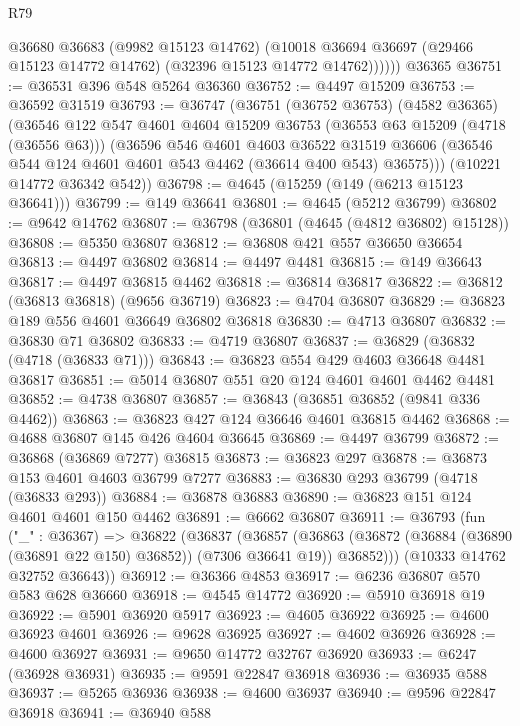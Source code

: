 \begin{lexlean}{R79}
\begin{coremodule}
            @36680
            @36683
            (@9982 @15123 @14762)
            (@10018 @36694 @36697 (@29466 @15123 @14772 @14762) (@32396 @15123 @14772 @14762))))))
    @36365
@36751 := @36531 @396 @548 @5264 @36360
@36752 := @4497 @15209
@36753 := @36592 @31519
@36793 := @36747
    (@36751
      (@36752 @36753)
      (@4582 @36365)
      (@36546
        @122
        @547
        @4601
        @4604
        @15209
        @36753
        (@36553 @63 @15209 (@4718 (@36556 @63)))
        (@36596
          @546
          @4601
          @4603
          @36522
          @31519
          @36606
          (@36546 @544 @124 @4601 @4601 @543 @4462 (@36614 @400 @543) @36575)))
      (@10221 @14772 @36342 @542))
@36798 := @4645 (@15259 (@149 (@6213 @15123 @36641)))
@36799 := @149 @36641
@36801 := @4645 (@5212 @36799)
@36802 := @9642 @14762
@36807 := @36798 (@36801 (@4645 (@4812 @36802) @15128))
@36808 := @5350 @36807
@36812 := @36808 @421 @557 @36650 @36654
@36813 := @4497 @36802
@36814 := @4497 @4481
@36815 := @149 @36643
@36817 := @4497 @36815 @4462
@36818 := @36814 @36817
@36822 := @36812 (@36813 @36818) (@9656 @36719)
@36823 := @4704 @36807
@36829 := @36823 @189 @556 @4601 @36649 @36802 @36818
@36830 := @4713 @36807
@36832 := @36830 @71 @36802
@36833 := @4719 @36807
@36837 := @36829 (@36832 (@4718 (@36833 @71)))
@36843 := @36823 @554 @429 @4603 @36648 @4481 @36817
@36851 := @5014 @36807 @551 @20 @124 @4601 @4601 @4462 @4481
@36852 := @4738 @36807
@36857 := @36843 (@36851 @36852 (@9841 @336 @4462))
@36863 := @36823 @427 @124 @36646 @4601 @36815 @4462
@36868 := @4688 @36807 @145 @426 @4604 @36645
@36869 := @4497 @36799
@36872 := @36868 (@36869 @7277) @36815
@36873 := @36823 @297
@36878 := @36873 @153 @4601 @4603 @36799 @7277
@36883 := @36830 @293 @36799 (@4718 (@36833 @293))
@36884 := @36878 @36883
@36890 := @36823 @151 @124 @4601 @4601 @150 @4462
@36891 := @6662 @36807
@36911 := @36793
    (fun ("_" : @36367) =>
    @36822
      (@36837
        (@36857
          (@36863 (@36872 (@36884 (@36890 (@36891 @22 @150) @36852)) (@7306 @36641 @19)) @36852)))
      (@10333 @14762 @32752 @36643))
@36912 := @36366 @4853
@36917 := @6236 @36807 @570 @583 @628 @36660
@36918 := @4545 @14772
@36920 := @5910 @36918 @19
@36922 := @5901 @36920 @5917
@36923 := @4605 @36922
@36925 := @4600 @36923 @4601
@36926 := @9628 @36925
@36927 := @4602 @36926
@36928 := @4600 @36927
@36931 := @9650 @14772 @32767 @36920
@36933 := @6247 (@36928 @36931)
@36935 := @9591 @22847 @36918
@36936 := @36935 @588
@36937 := @5265 @36936
@36938 := @4600 @36937
@36940 := @9596 @22847 @36918
@36941 := @36940 @588

\end{coremodule}
\end{lexlean}
